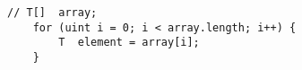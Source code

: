 \begin{lstlisting}[language=Solidity]
	// T[]  array;
	for (uint i = 0; i < array.length; i++) {
		T  element = array[i];
	}
\end{lstlisting}